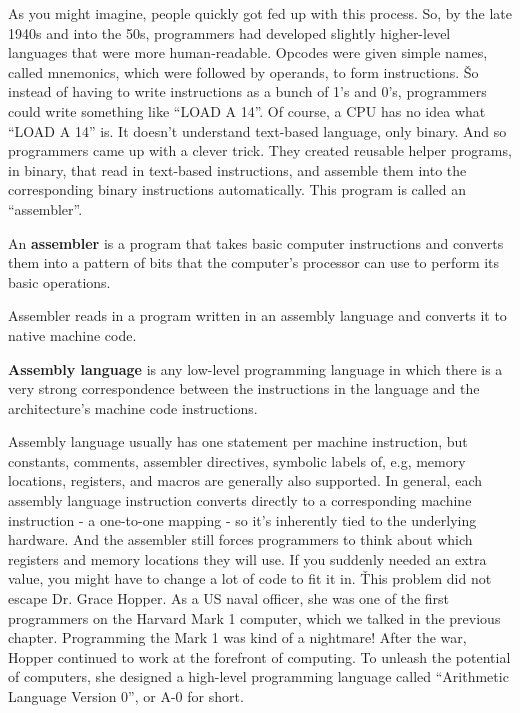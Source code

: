 As you might imagine, people quickly got fed up with this process. So, by the late 1940s and into the 50s,
programmers had developed slightly higher-level languages that were more human-readable. Opcodes were given simple
names, called mnemonics, which were followed by operands, to form instructions. \v

So instead of having to write instructions as a bunch of 1's and 0's, programmers could write something like ``LOAD A
14''. Of course, a CPU has no idea what ``LOAD A 14'' is. It doesn't understand text-based language, only binary. And
so programmers came up with a clever trick. They created reusable helper programs, in binary, that read in text-based
instructions, and assemble them into the corresponding binary instructions automatically. This program is called an
``assembler''.

\bd[Assembler]
An \textbf{assembler} is a program that takes basic computer instructions and converts them into a pattern of bits
that the computer's processor can use to perform its basic operations.
\ed

Assembler reads in a program written in an assembly language and converts it to native machine code.

\textbf{Assembly language} is any low-level programming language in which there is a very strong correspondence
between the instructions in the language and the architecture's machine code instructions.
\ed

Assembly language usually has one statement per machine instruction, but constants, comments, assembler directives,
symbolic labels of, e.g, memory locations, registers, and macros are generally also supported. In general, each
assembly language instruction converts directly to a corresponding machine instruction - a one-to-one mapping - so
it's inherently tied to the underlying hardware. And the assembler still forces programmers to think about which
registers and memory locations they will use. If you suddenly needed an extra value, you might have to change a lot
of code to fit it in. \v

This problem did not escape Dr. Grace Hopper. As a US naval officer, she was one of the first programmers on the
Harvard Mark 1 computer, which we talked in the previous chapter. Programming the Mark 1 was kind of a nightmare!
After the war, Hopper continued to work at the forefront of computing. To unleash the potential of computers, she
designed a high-level programming language called ``Arithmetic Language Version 0'', or A-0 for short.

